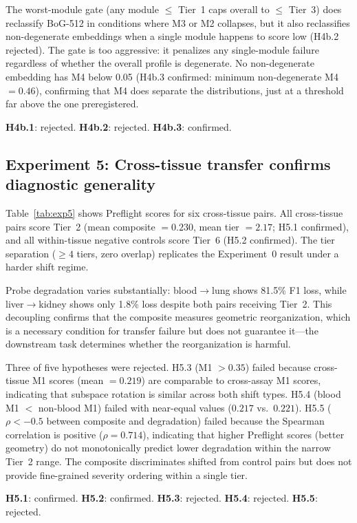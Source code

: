\documentclass[11pt,letterpaper]{article}
\begin{document}
The worst-module gate (any module $\leq$ Tier~1 caps overall to $\leq$ Tier~3) does reclassify BoG-512 in conditions where M3 or M2 collapses, but it also reclassifies non-degenerate embeddings when a single module happens to score low (H4b.2 rejected). The gate is too aggressive: it penalizes any single-module failure regardless of whether the overall profile is degenerate. No non-degenerate embedding has M4 below 0.05 (H4b.3 confirmed: minimum non-degenerate M4 $= 0.46$), confirming that M4 does separate the distributions, just at a threshold far above the one preregistered.

\textbf{H4b.1}: rejected. \textbf{H4b.2}: rejected. \textbf{H4b.3}: confirmed.

\subsection{Experiment 5: Cross-tissue transfer confirms diagnostic generality}

Table~\ref{tab:exp5} shows Preflight scores for six cross-tissue pairs. All cross-tissue pairs score Tier~2 (mean composite $= 0.230$, mean tier $= 2.17$; H5.1 confirmed), and all within-tissue negative controls score Tier~6 (H5.2 confirmed). The tier separation ($\geq 4$ tiers, zero overlap) replicates the Experiment~0 result under a harder shift regime.

Probe degradation varies substantially: blood$\to$lung shows 81.5\% F1 loss, while liver$\to$kidney shows only 1.8\% loss despite both pairs receiving Tier~2. This decoupling confirms that the composite measures geometric reorganization, which is a necessary condition for transfer failure but does not guarantee it---the downstream task determines whether the reorganization is harmful.

Three of five hypotheses were rejected. H5.3 (M1 $> 0.35$) failed because cross-tissue M1 scores (mean $= 0.219$) are comparable to cross-assay M1 scores, indicating that subspace rotation is similar across both shift types. H5.4 (blood M1 $<$ non-blood M1) failed with near-equal values ($0.217$ vs.\ $0.221$). H5.5 ($\rho < -0.5$ between composite and degradation) failed because the Spearman correlation is positive ($\rho = 0.714$), indicating that higher Preflight scores (better geometry) do not monotonically predict lower degradation within the narrow Tier~2 range. The composite discriminates shifted from control pairs but does not provide fine-grained severity ordering within a single tier.

\textbf{H5.1}: confirmed. \textbf{H5.2}: confirmed. \textbf{H5.3}: rejected. \textbf{H5.4}: rejected. \textbf{H5.5}: rejected.
\end{document}

